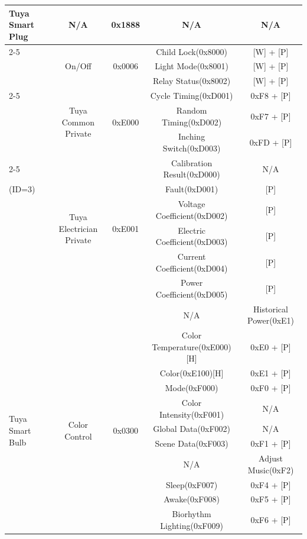 \documentclass[10pt,journal,compsoc]{IEEEtran}
\begin{document}
\begin{table}[h]
\begin{center}
{\begin{tabular}{l|cccc}
             \multirow{14}{*}{Tuya Smart Plug} & N/A & 0x1888 & N/A & N/A \\ \cline{2-5}
             ~ & \multirow{3}{*}{On/Off} & \multirow{3}{*}{0x0006} & Child Lock(0x8000) & [W] + [P]\\
             ~ & ~ & ~ & Light Mode(0x8001) & [W] + [P]\\
             ~ & ~ & ~ & Relay Status(0x8002) & [W] + [P] \\ \cline{2-5}
             ~ & \multirow{3}{*}{Tuya Common Private} & \multirow{3}{*}{0xE000} & Cycle Timing(0xD001) & 0xF8 + [P] \\
             ~ & ~ & ~ & Random Timing(0xD002) & 0xF7 + [P] \\
             ~ & ~ & ~ & Inching Switch(0xD003) & 0xFD + [P] \\ \cline{2-5}
             ~ & \multirow{6}{*}{Tuya Electrician Private} & \multirow{6}{*}{0xE001} & Calibration Result(0xD000) & N/A \\
             \quad\quad\;\;(ID=3) & ~ & ~ & Fault(0xD001) & [P]\\
             ~ & ~ & ~ & Voltage Coefficient(0xD002) & [P] \\
             ~ & ~ & ~ & Electric Coefficient(0xD003) & [P] \\
             ~ & ~ & ~ & Current Coefficient(0xD004) & [P] \\
             ~ & ~ & ~ & Power Coefficient(0xD005) & [P] \\
             ~ & ~ & ~ & N/A & Historical Power(0xE1) \\ \hline
             \multirow{18}{*}{Tuya Smart Bulb} & \multirow{16}{*}{Color Control} & \multirow{16}{*}{0x0300} & Color Temperature(0xE000)[H] & 0xE0 + [P] \\
             ~ & ~ & ~ & Color(0xE100)[H] & 0xE1 + [P] \\
             ~ & ~ & ~ & Mode(0xF000) & 0xF0 + [P]\\
             ~ & ~ & ~ & Color Intensity(0xF001) & N/A\\
             ~ & ~ & ~ & Global Data(0xF002) & N/A \\
             ~ & ~ & ~ & Scene Data(0xF003) & 0xF1 + [P]\\
             ~ & ~ & ~ & N/A & Adjust Music(0xF2)\\
             ~ & ~ & ~ & Sleep(0xF007) & 0xF4 + [P]\\
             ~ & ~ & ~ & Awake(0xF008) & 0xF5 + [P]\\
             ~ & ~ & ~ & Biorhythm Lighting(0xF009) & 0xF6 + [P]\\

\end{tabular}}
\end{center}
\end{table}
\end{document}
